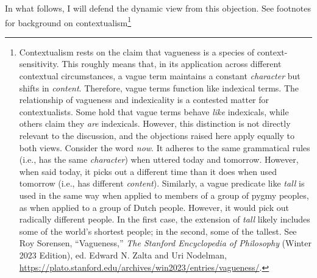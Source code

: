 In what follows, I will defend the dynamic view from this objection. See
footnotes for background on contextualism\footnote{Contextualism rests
  on the claim that vagueness is a species of context-sensitivity. This
  roughly means that, in its application across different contextual
  circumstances, a vague term maintains a constant \emph{character} but
  shifts in \emph{content}. Therefore, vague terms function like
  indexical terms. The relationship of vagueness and indexicality is a
  contested matter for contextualists. Some hold that vague terms behave
  \emph{like} indexicals, while others claim they \emph{are} indexicals.
  However, this distinction is not directly relevant to the discussion,
  and the objections raised here apply equally to both views. Consider
  the word \emph{now}. It adheres to the same grammatical rules (i.e.,
  has the same \emph{character}) when uttered today and tomorrow.
  However, when said today, it picks out a different time than it does
  when used tomorrow (i.e., has different \emph{content}). Similarly, a
  vague predicate like \emph{tall} is used in the same way when applied
  to members of a group of pygmy peoples, as when applied to a group of
  Dutch people. However, it would pick out radically different people.
  In the first case, the extension of \emph{tall} likely includes some
  of the world's shortest people; in the second, some of the tallest.
  See Roy Sorensen, ``Vagueness,'' \emph{The Stanford Encyclopedia of
  Philosophy} (Winter 2023 Edition), ed. Edward N. Zalta and Uri
  Nodelman,
  \url{https://plato.stanford.edu/archives/win2023/entries/vagueness/}.}
